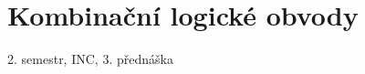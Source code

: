 \documentclass[a4paper, 11pt]{report}
\begin{document}





















\chapter{Kombinační logické obvody} \label{cha:2}

2. semestr, INC, 3. přednáška
\end{document}
